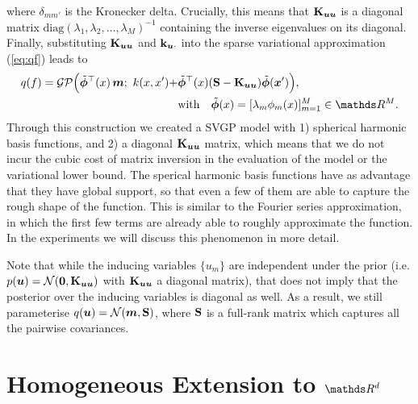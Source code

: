 where $\delta_{mm'}$ is the Kronecker delta. Crucially, this means that $\mathbf{{K}}_{\bm{u} \bm{u}}$ is a diagonal matrix $\textrm{diag}(\lambda_1, \lambda_2, \ldots, \lambda_M)^{-1}$ containing the inverse eigenvalues on its diagonal. Finally, substituting $\mathbf{{K}}_{\bm{u} \bm{u}}$ and $\mathbf{k}_{\bm{u} \cdot}$ into the sparse variational approximation (\cref{eq:qf}) leads to
\begin{equation}
\begin{aligned}
    q(f) =
    \GP\Big(\tilde{\bm{\phi}}^\top(x)\,\vm;\ k(x, x') + &\tilde{\bm{\phi}}^\top(x)(\MS - \Kuu)\tilde{\bm{\phi}}(\vx') \Big),\\ 
    &\text{with}\quad\tilde{\bm{\phi}}(x) = [\lambda_m \phi_m(x)]_{m=1}^M \in \Reals^M.
\end{aligned}
\end{equation}
Through this construction we created a SVGP model with 1) spherical harmonic basis functions, and 2) a diagonal $\mathbf{{K}}_{\bm{u} \bm{u}}$ matrix, which means that we do not incur the cubic cost of matrix inversion in the evaluation of the model or the variational lower bound. The sperical harmonic basis functions have as advantage that they have global support, so that even a few of them are able to capture the rough shape of the function. This is similar to the Fourier series approximation, in which the first few terms are already able to roughly approximate the function. In the experiments we will discuss this phenomenon in more detail.

Note that while the inducing variables $\{u_m\}$ are independent under the prior (i.e. $p(\vu) = \NormDist{\bm{0}, \Kuu}$ with $\mathbf{{K}}_{\bm{u} \bm{u}}$ a diagonal matrix), that does not imply that the posterior over the inducing variables is diagonal as well. As a result, we still parameterise $q(\vu) = \NormDist{\vm, \MS}$, where $\mathbf{{S}}$ is a full-rank matrix which captures all the pairwise covariances.

\section{Homogeneous Extension to $\Reals^d$}

